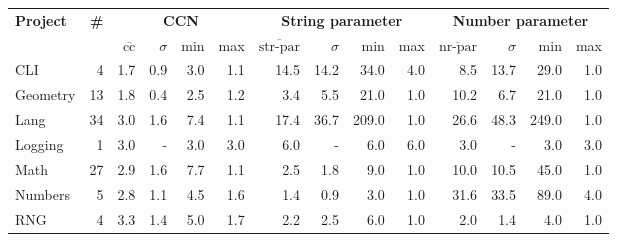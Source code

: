 \begin{tabular}{ l r | r@{\hskip 0.08in}r@{\hskip 0.08in}r@{\hskip 0.08in}r | r@{\hskip 0.08in}r@{\hskip 0.08in}r@{\hskip 0.08in}r | r@{\hskip 0.08in}r@{\hskip 0.08in}r@{\hskip 0.08in}r }
\hline 
\textbf{Project} & \textbf{\#} & \multicolumn{4}{c}{\textbf{CCN}} & \multicolumn{4}{c}{\textbf{String parameter}} & \multicolumn{4}{c}{\textbf{Number parameter}} \\ 
  &   & $\overline{\text{cc}}$ & $\sigma$ & min & max & $\overline{\text{str-par}}$ & $\sigma$ & min & max & $\overline{\text{nr-par}}$ & $\sigma$ & min & max \\ 
\hline 
CLI & 4 &1.7 &0.9 &3.0 & 1.1 &14.5 &14.2 &34.0 & 4.0 &8.5 &13.7 &29.0 & 1.0 \\ 
Geometry & 13 &1.8 &0.4 &2.5 & 1.2 &3.4 &5.5 &21.0 & 1.0 &10.2 &6.7 &21.0 & 1.0 \\ 
Lang & 34 &3.0 &1.6 &7.4 & 1.1 &17.4 &36.7 &209.0 & 1.0 &26.6 &48.3 &249.0 & 1.0 \\ 
Logging & 1 &3.0 &- &3.0 & 3.0 &6.0 &- &6.0 & 6.0 &3.0 &- &3.0 & 3.0 \\ 
Math & 27 &2.9 &1.6 &7.7 & 1.1 &2.5 &1.8 &9.0 & 1.0 &10.0 &10.5 &45.0 & 1.0 \\ 
Numbers & 5 &2.8 &1.1 &4.5 & 1.6 &1.4 &0.9 &3.0 & 1.0 &31.6 &33.5 &89.0 & 4.0 \\ 
RNG & 4 &3.3 &1.4 &5.0 & 1.7 &2.2 &2.5 &6.0 & 1.0 &2.0 &1.4 &4.0 & 1.0 \\ 
\hline 
\end{tabular}